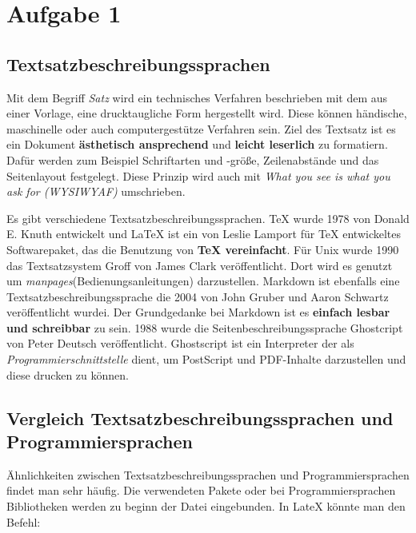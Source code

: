 \chapter{Aufgabe 1}
\section{Textsatzbeschreibungssprachen}
Mit dem Begriff \textit{Satz} wird ein technisches Verfahren beschrieben mit dem aus einer Vorlage, eine drucktaugliche Form hergestellt wird.
Diese können händische, maschinelle oder auch computergestütze Verfahren sein.
Ziel des Textsatz ist es ein Dokument \textbf{ästhetisch ansprechend} und \textbf{leicht leserlich} zu formatiern.
Dafür werden zum Beispiel Schriftarten und -größe, Zeilenabstände und das Seitenlayout festgelegt\cite{satzwiki:2023}.
Diese Prinzip wird auch mit \textit{What you see is what you ask for (WYSIWYAF)} umschrieben.\par
Es gibt verschiedene Textsatzbeschreibungssprachen.
TeX wurde 1978 von Donald E. Knuth entwickelt und LaTeX\cite{latex:2023} ist ein von Leslie Lamport für TeX\cite{tex:2023} entwickeltes Softwarepaket, das die Benutzung von \textbf{TeX vereinfacht}.
Für Unix wurde 1990 das Textsatzsystem Groff von James Clark veröffentlicht.
Dort wird es genutzt um \textit{manpages}(Bedienungsanleitungen) darzustellen\cite{groff:2022}.
Markdown ist ebenfalls eine Textsatzbeschreibungssprache die 2004 von John Gruber und Aaron Schwartz veröffentlicht wurdei.
Der Grundgedanke bei Markdown ist es \textbf{einfach lesbar und schreibbar} zu sein\cite{lasar:2013}.
1988 wurde die Seitenbeschreibungssprache Ghostcript von Peter Deutsch veröffentlicht.
Ghostscript ist ein Interpreter der als \textit{Programmierschnittstelle} dient, um PostScript und PDF-Inhalte darzustellen und diese drucken zu können\cite{ghostscript:2022}. 

\section{Vergleich Textsatzbeschreibungssprachen und Programmiersprachen}
Ähnlichkeiten zwischen Textsatzbeschreibungssprachen und Programmiersprachen findet man sehr häufig. 
Die verwendeten Pakete oder bei Programmiersprachen Bibliotheken werden zu beginn der Datei eingebunden.
In LateX könnte man den Befehl:
\begin{lstlisting}
 


\end{lstlisting}

